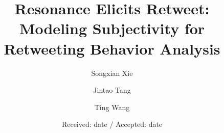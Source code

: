 \documentclass[smallcondensed]{svjour3}     %
\begin{document}
\title{Resonance Elicits Retweet: Modeling Subjectivity for Retweeting Behavior Analysis%
}


\author{Songxian Xie         \and
		Jintao Tang           \and
        Ting Wang %
}



\date{Received: date / Accepted: date}


\maketitle
\end{document}
